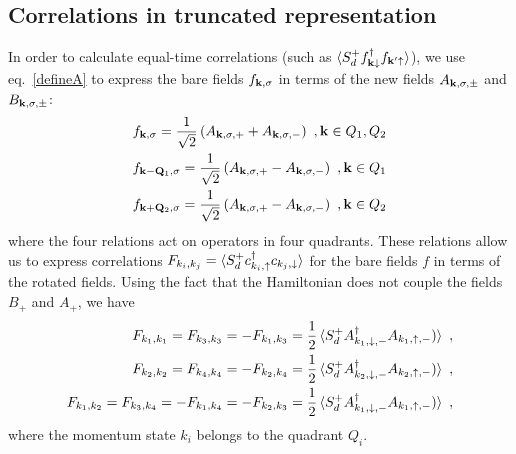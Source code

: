 \subsection*{Correlations in truncated representation}
In order to calculate equal-time correlations (such as \(\braket{S_d^+ f^\dagger_{{\bf k}\downarrow}f_{{\bf k}^\prime \uparrow}} \)), we use eq.~\ref{defineA} to express the bare fields \(f_{{\bf k},\sigma}\) in terms of the new fields \(A_{{\bf k},\sigma,\pm}\) and \(B_{{\bf k},\sigma,\pm}\):
\begin{equation}\begin{aligned}
	f_{{\bf k},\sigma} = \frac{1}{\sqrt{2}}\left(A_{{\bf k},\sigma, +} + A_{{\bf k},\sigma,-}\right)~,{\bf k} \in {Q}_1, Q_2\\
	f_{{\bf k} - {\bf Q}_1,\sigma} = \frac{1}{\sqrt{2}}\left(A_{{\bf k},\sigma, +} - A_{{\bf k},\sigma,-}\right)~,{\bf k} \in {Q}_1\\
	f_{{\bf k} + {\bf Q}_2,\sigma} = \frac{1}{\sqrt{2}}\left(A_{{\bf k},\sigma, +} - A_{{\bf k},\sigma,-}\right)~,{\bf k} \in {Q}_2\\
\end{aligned}\end{equation}
where the four relations act on operators in four quadrants. These relations allow us to express correlations \(F_{k_i, k_j} = \braket{S_d^+ c^\dagger_{k_i, \uparrow}c_{k_j, \downarrow}}\) for the bare fields \(f\) in terms of the rotated fields. Using the fact that the Hamiltonian does not couple the fields \(B_{+}\) and \(A_{+}\), we have
\begin{equation}\begin{aligned}
	F_{k_1, k_1} = F_{k_3, k_3} = -F_{k_1, k_3} = \frac{1}{2}\braket{S_d^+ A^\dagger_{k_1,\downarrow,-}A_{k_1,\uparrow,-})}~,\\
	F_{k_2, k_2} = F_{k_4, k_4} = -F_{k_2, k_4} = \frac{1}{2}\braket{S_d^+ A^\dagger_{k_2,\downarrow,-}A_{k_2,\uparrow,-})}~,\\
	F_{k_1, k_2} = F_{k_3, k_4} = -F_{k_1, k_4} = -F_{k_2, k_3} = \frac{1}{2}\braket{S_d^+ A^\dagger_{k_1,\downarrow,-}A_{k_1,\uparrow,-})}~,
\end{aligned}\end{equation}
where the momentum state \(k_i\) belongs to the quadrant \(Q_i\).

